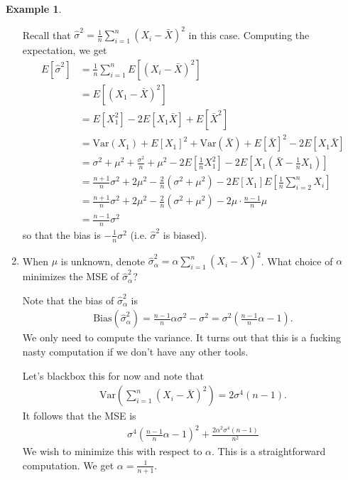 \documentclass[11pt]{amsart}
\theoremstyle{definition}
\newtheorem{example}[theorem]{Example}
\numberwithin{equation}{section}
\begin{document}
\begin{example}
\begin{enumerate}
        Recall that $\hat\sigma^2=\frac{1}{n}\sum_{i=1}^n(X_i-\bar X)^2$ in this case. Computing the expectation, we get
        \begin{align*}
            E[\hat\sigma^2]&=\frac{1}{n}\sum_{i=1}^nE[(X_i-\bar X)^2]\\
            &=E[(X_1-\bar X)^2]\\
            &=E[X_1^2]-2E[X_1\bar X]+E[\bar X^2]\\
            &=\mathrm{Var}(X_1)+E[X_1]^2+\mathrm{Var}(\bar X)+E[\bar X]^2-2E[X_1\bar X]\\
            &=\sigma^2+\mu^2+\frac{\sigma^2}{n}+\mu^2-2E[\frac{1}{n}X_1^2]-2E[X_1(\bar X-\frac{1}{n}X_1)]\\
            &=\frac{n+1}{n}\sigma^2+2\mu^2-\frac{2}{n}(\sigma^2+\mu^2)-2E[X_1]E[\frac{1}{n}\sum_{i=2}^nX_i]\\
            &=\frac{n+1}{n}\sigma^2+2\mu^2-\frac{2}{n}(\sigma^2+\mu^2)-2\mu\cdot\frac{n-1}{n}\mu\\
            &=\frac{n-1}{n}\sigma^2
        \end{align*}
        so that the bias is $-\frac{1}{n}\sigma^2$ (i.e. $\hat\sigma^2$ is biased).
        \item When $\mu$ is unknown, denote $\hat\sigma^2_\alpha=\alpha\sum_{i=1}^n(X_i-\bar X)^2$. What choice of $\alpha$ minimizes the MSE of $\hat\sigma^2_\alpha$?

        Note that the bias of $\hat\sigma^2_\alpha$ is 
        \begin{align*}
            \mathrm{Bias}(\hat\sigma^2_\alpha)=\frac{n-1}{n}\alpha\sigma^2-\sigma^2=\sigma^2\left(\frac{n-1}{n}\alpha-1\right).
        \end{align*}
        We only need to compute the variance. It turns out that this is a fucking nasty computation if we don't have any other tools.

        Let's blackbox this for now and note that
        \begin{align*}
            \mathrm{Var}(\sum_{i=1}^n(X_i-\bar X)^2)=2\sigma^4(n-1).
        \end{align*}
        It follows that the MSE is
        \begin{align*}
            \sigma^4\left(\frac{n-1}{n}\alpha-1\right)^2+\frac{2\alpha^2\sigma^4(n-1)}{n^2}
        \end{align*}
        We wish to minimize this with respect to $\alpha$. This is a straightforward computation. We get $\alpha=\frac{1}{n+1}$.
    \end{enumerate}
\end{example}
\end{document}
